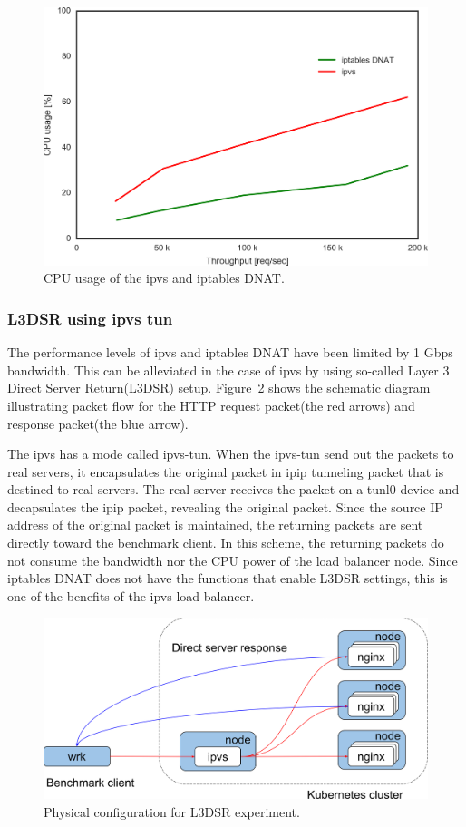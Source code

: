 \begin{figure}[h]
  \centering
  \includegraphics[width=0.8\columnwidth]{Figs/cpu_usage}
  \caption{CPU usage of the ipvs and iptables DNAT.}
  \label{fig:cpu_usage}
\end{figure}

\FloatBarrier

\subsubsection{L3DSR using ipvs tun}

The performance levels of ipvs and iptables DNAT have been limited by 1 Gbps bandwidth.
This can be alleviated in the case of ipvs by using so-called Layer 3 Direct Server Return(L3DSR) setup.
Figure~\ref{fig:benchmark-schem-dsr} shows the schematic diagram illustrating packet flow for the HTTP request packet(the red arrows) and response packet(the blue arrow).

The ipvs has a mode called ipvs-tun.
When the ipvs-tun send out the packets to real servers, it encapsulates the original packet in ipip tunneling packet that is destined to real servers.
The real server receives the packet on a tunl0 device and decapsulates the ipip packet, revealing the original packet.
Since the source IP address of the original packet is maintained, the returning packets are sent directly toward the benchmark client.
In this scheme, the returning packets do not consume the bandwidth nor the CPU power of the load balancer node.
Since iptables DNAT does not have the functions that enable L3DSR settings, this is one of the benefits of the ipvs load balancer.

\begin{figure}[h]
  \centering
  \includegraphics[width=0.8\columnwidth]{Figs/benchmark-schem-dsr}
  \caption{Physical configuration for L3DSR experiment.}
  \label{fig:benchmark-schem-dsr}
\end{figure}

